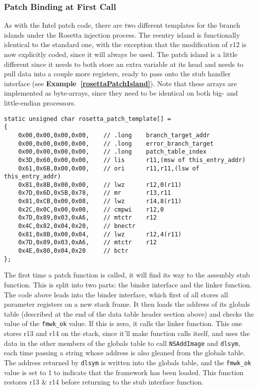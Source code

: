 \documentclass[english]{article}
\begin{document}
\subsubsection{Patch Binding at First Call}
As with the Intel patch code, there are two different templates for the branch islands under the Rosetta injection process. The reentry island is functionally identical to the standard one, with the exception that the modification of r12 is now explicitly coded, since it will always be used. The patch island is a little different since it needs to both store an extra variable at its head and needs to pull data into a couple more registers, ready to pass onto the stub handler interface (see \textbf{Example~\ref{rosettaPatchIsland}}). Note that these arrays are implemented as byte-arrays, since they need to be identical on both big- and little-endian processors.

\begin{lstlisting}[label= rosettaPatchIsland, caption=Rosetta branch-to-patch island template.]
static unsigned char rosetta_patch_template[] =
{
    0x00,0x00,0x00,0x00,    // .long    branch_target_addr
    0x00,0x00,0x00,0x00,    // .long    error_branch_target
    0x00,0x00,0x00,0x00,    // .long    patch_table_index
    0x3D,0x60,0x00,0x00,    // lis      r11,(msw of this_entry_addr)
    0x61,0x6B,0x00,0x00,    // ori      r11,r11,(lsw of this_entry_addr)
    0x81,0x8B,0x00,0x00,    // lwz      r12,0(r11)
    0x7D,0x6D,0x5B,0x78,    // mr       r13,r11
    0x81,0xCB,0x00,0x08,    // lwz      r14,8(r11)
    0x2C,0x0C,0x00,0x00,    // cmpwi    r12,0
    0x7D,0x89,0x03,0xA6,    // mtctr    r12
    0x4C,0x82,0x04,0x20,    // bnectr
    0x81,0x8B,0x00,0x04,    // lwz      r12,4(r11)
    0x7D,0x89,0x03,0xA6,    // mtctr    r12
    0x4E,0x80,0x04,0x20     // bctr
};
\end{lstlisting}

The first time a patch function is called, it will find its way to the assembly stub function. This is split into two parts: the binder interface and the linker function. The code above leads into the binder interface, which first of all stores all parameter registers on a new stack frame. It then loads the address of its globals table (described at the end of the data table header section above) and checks the value of the \texttt{fmwk\_ok} value. If this is zero, it calls the linker function. This one stores r13 and r14 on the stack, since it'll make function calls itself, and uses the data in the other members of the globals table to call \texttt{NSAddImage} and \texttt{dlsym}, each time passing a string whose address is also gleaned from the globals table. The address returned by \texttt{dlsym} is written into the globals table, and the \texttt{fmwk\_ok} value is set to 1 to indicate that the framework has been loaded. This function restores r13 \& r14 before returning to the stub interface function.
\end{document}
